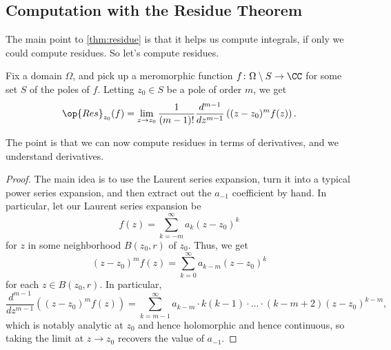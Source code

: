 \subsection{Computation with the Residue Theorem}
The main point to \autoref{thm:residue} is that it helps us compute integrals, if only we could compute residues. So let's compute residues.
\begin{lemma}
	Fix a domain $\Omega$, and pick up a meromorphic function $f\colon \Omega\setminus S\to\CC$ for some set $S$ of the poles of $f$. Letting $z_0\in S$ be a pole of order $m$, we get
	\[\op{Res}_{z_0}(f)=\lim_{z\to z_0}\frac1{(m-1)!}\frac{d^{m-1}}{dz^{m-1}}\left((z-z_0)^mf(z)\right).\]
\end{lemma}
The point is that we can now compute residues in terms of derivatives, and we understand derivatives.
\begin{proof}
	The main idea is to use the Laurent series expansion, turn it into a typical power series expansion, and then extract out the $a_{-1}$ coefficient by hand. In particular, let our Laurent series expansion be
	\[f(z)=\sum_{k=-m}^\infty a_k(z-z_0)^k\]
	for $z$ in some neighborhood $B(z_0,r)$ of $z_0$. Thus, we get
	\[(z-z_0)^mf(z)=\sum_{k=0}^\infty a_{k-m}(z-z_0)^k\]
	for each $z\in B(z_0,r)$. In particular,
	\[\frac{d^{m-1}}{dz^{m-1}}\left((z-z_0)^mf(z)\right)=\sum_{k=m-1}^\infty a_{k-m}\cdot k(k-1)\cdot\ldots\cdot(k-m+2)(z-z_0)^{k-m},\]
	which is notably analytic at $z_0$ and hence holomorphic and hence continuous, so taking the limit at $z\to z_0$ recovers the value of $a_{-1}$.
\end{proof}


